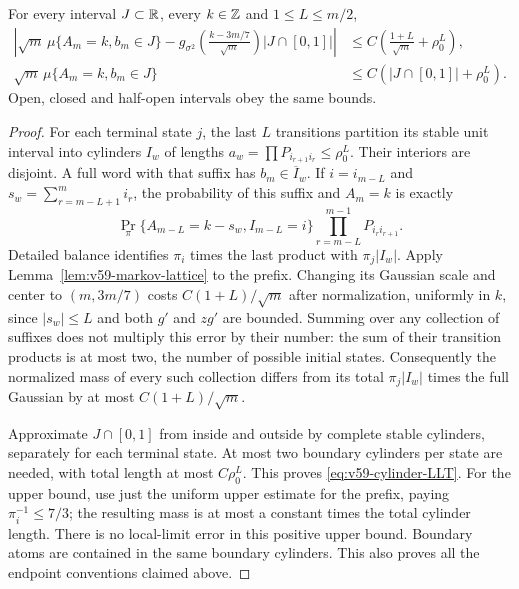 \begin{lemma}
\label{lem:v59-cylinder-local}
For every interval $J\subset\mathbb R$, every $k\in\mathbb Z$ and $1\le L\le m/2$,
\begin{align}
 \left|\sqrt m\,\mu\{A_m=k,b_m\in J\}
   -g_{\sigma^2}\left(\frac{k-3m/7}{\sqrt m}\right)
                              |J\cap[0,1]|\right|
     &\le C\left(\frac{1+L}{\sqrt m}+\rho_0^L\right),
                                               \label{eq:v59-cylinder-LLT}\\
 \sqrt m\,\mu\{A_m=k,b_m\in J\}
     &\le C(|J\cap[0,1]|+\rho_0^L).
                                               \label{eq:v59-cylinder-upper}
\end{align}
Open, closed and half-open intervals obey the same bounds.
\end{lemma}
\begin{proof}
For each terminal state $j$, the last $L$ transitions partition its
stable unit interval into cylinders $I_w$ of lengths
$a_w=\prod P_{i_{r+1}i_r}\le\rho_0^L$. Their interiors are disjoint.
A full word with that suffix has $b_m\in\overline I_w$.
If $i=i_{m-L}$ and $s_w=\sum_{r=m-L+1}^mi_r$, the probability of
this suffix and $A_m=k$ is exactly
\[
 \Pr_\pi\{A_{m-L}=k-s_w,I_{m-L}=i\}
                         \prod_{r=m-L}^{m-1}P_{i_ri_{r+1}}.
\]
Detailed balance identifies $\pi_i$ times the last product with
$\pi_j|I_w|$. Apply Lemma~\ref{lem:v59-markov-lattice} to the prefix.
Changing its Gaussian scale and center to $(m,3m/7)$ costs
$C(1+L)/\sqrt m$ after normalization, uniformly in $k$, since
$|s_w|\le L$ and both $g'$ and $zg'$ are bounded. Summing over any
collection of suffixes does not multiply this error by their number:
the sum of their transition products is at most two, the number of
possible initial states. Consequently the normalized mass of every
such collection differs from its total $\pi_j|I_w|$ times the full
Gaussian by at most $C(1+L)/\sqrt m$.

Approximate $J\cap[0,1]$ from inside and outside by complete stable
cylinders, separately for each terminal state. At most two boundary
cylinders per state are needed, with total length at most $C\rho_0^L$.
This proves \eqref{eq:v59-cylinder-LLT}. For the upper bound, use just
the uniform upper estimate for the prefix, paying $\pi_i^{-1}\le7/3$;
the resulting mass is at most a constant times the total cylinder
length. There is no local-limit error in this positive upper bound.
Boundary atoms are contained in the same boundary cylinders. This also
proves all the endpoint conventions claimed above.
\end{proof}

